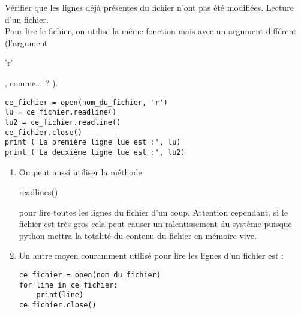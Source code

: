 \begin{enonce}
	Vérifier que les lignes déjà présentes du fichier n'ont pas été modifiées.
	\pagebreak
	\ques Lecture d'un fichier. \\

	Pour lire le fichier, on utilise la même fonction mais avec un argument différent (l'argument \begin{texttt}'r'\end{texttt}, comme\dots ? ).

	\begin{verbatim}
ce_fichier = open(nom_du_fichier, 'r') 
lu = ce_fichier.readline()
lu2 = ce_fichier.readline()
ce_fichier.close()
print ('La première ligne lue est :', lu)
print ('La deuxième ligne lue est :', lu2)

\end{verbatim}


	 \begin{enumerate}
		\item On peut aussi utiliser la méthode \begin{texttt}readlines()\end{texttt} pour lire toutes les lignes du fichier d'un coup. Attention cependant, si le fichier est très gros cela peut causer un ralentissement du système puisque python mettra la totalité du contenu du fichier en mémoire vive.
		\item Un autre moyen couramment utilisé pour lire les lignes d'un fichier est :
		      \begin{verbatim}ce_fichier = open(nom_du_fichier)
for line in ce_fichier:
	print(line)
ce_fichier.close()
\end{verbatim}
	\end{enumerate}
\end{enonce}

\begin{correction}

\end{correction}



\exo

